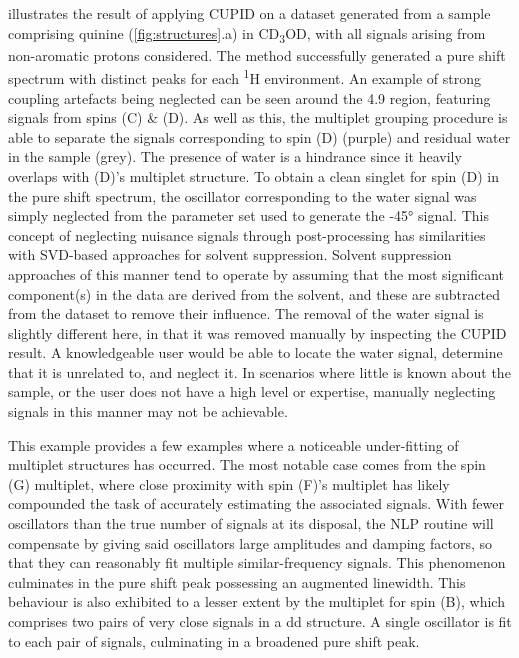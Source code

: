  illustrates the result of applying \ac{CUPID} on
a dataset generated from a sample comprising quinine (\cref{fig:structures}.a)
in CD\textsubscript{3}OD,
with all signals arising from non-aromatic protons considered. The method
successfully generated a pure shift spectrum with distinct peaks for each
\textsuperscript{1}H environment.
An example of strong coupling artefacts being neglected can be seen
around the \qty{4.9}{\partspermillion} region, featuring signals from spins (C)
\& (D). As well as this, the multiplet grouping procedure is able to separate
the signals corresponding to spin (D) (purple) and residual water in the sample
(grey).
The presence of water is a hindrance since it heavily overlaps with (D)'s
multiplet structure.
To obtain a clean singlet for spin (D) in the pure shift spectrum, the
oscillator corresponding to the water signal was simply neglected from
the parameter set used to generate the \ang{-45} signal. This concept of
neglecting nuisance signals through post-processing has similarities with
\ac{SVD}-based approaches for solvent suppression\cite{Zhu1997}.
Solvent suppression approaches of this manner tend to operate by assuming
that the most significant component(s) in the data are derived from the
solvent, and these are subtracted from the dataset to
remove their influence. The removal of the water signal is slightly
different here, in that it was removed manually by inspecting the
\ac{CUPID} result. A knowledgeable user would be able to locate the water
signal, determine that it is unrelated to, and neglect it. In scenarios where
little is known about the sample, or the user does not have a high level or
expertise, manually neglecting signals in this manner may not be achievable.

This example provides a few examples where a noticeable under-fitting of
multiplet structures has occurred.
The most notable case comes from the spin (G) multiplet, where close proximity
with spin (F)'s multiplet has likely compounded the task of accurately
estimating the associated signals. With fewer oscillators than the true number
of signals at its disposal, the \ac{NLP} routine will compensate
by giving said oscillators large amplitudes and damping factors, so that they
can reasonably fit multiple similar-frequency signals. This phenomenon
culminates in the pure shift peak possessing an augmented linewidth.
This behaviour is also exhibited to a lesser extent by the multiplet for spin
(B), which comprises two pairs of very close signals in a dd structure. A
single oscillator is fit to each pair of signals, culminating in a broadened
pure shift peak.

